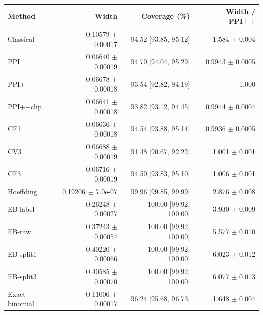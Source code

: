 \small
\begin{tabular}{lrrr}
\toprule
Method & Width & Coverage (\%) & Width / PPI++ \\
\midrule
Classical & 0.10579 $\pm$ 0.00017 & 94.52 [93.85, 95.12] & 1.584 $\pm$ 0.004 \\
PPI & 0.06640 $\pm$ 0.00019 & 94.70 [94.04, 95.29] & 0.9943 $\pm$ 0.0005 \\
PPI++ & 0.06678 $\pm$ 0.00018 & 93.54 [92.82, 94.19] & 1.000 \\
PPI++clip & 0.06641 $\pm$ 0.00018 & 93.82 [93.12, 94.45] & 0.9944 $\pm$ 0.0004 \\
CF1 & 0.06636 $\pm$ 0.00018 & 94.54 [93.88, 95.14] & 0.9936 $\pm$ 0.0005 \\
CV3 & 0.06688 $\pm$ 0.00019 & 91.48 [90.67, 92.22] & 1.001 $\pm$ 0.001 \\
CF3 & 0.06716 $\pm$ 0.00019 & 94.50 [93.83, 95.10] & 1.006 $\pm$ 0.001 \\
Hoeffding & 0.19206 $\pm$ 7.0e-07 & 99.96 [99.85, 99.99] & 2.876 $\pm$ 0.008 \\
EB-label & 0.26248 $\pm$ 0.00027 & 100.00 [99.92, 100.00] & 3.930 $\pm$ 0.009 \\
EB-raw & 0.37243 $\pm$ 0.00054 & 100.00 [99.92, 100.00] & 5.577 $\pm$ 0.010 \\
EB-split1 & 0.40220 $\pm$ 0.00066 & 100.00 [99.92, 100.00] & 6.023 $\pm$ 0.012 \\
EB-split3 & 0.40585 $\pm$ 0.00070 & 100.00 [99.92, 100.00] & 6.077 $\pm$ 0.013 \\
Exact-binomial & 0.11006 $\pm$ 0.00017 & 96.24 [95.68, 96.73] & 1.648 $\pm$ 0.004 \\
\bottomrule
\end{tabular}
